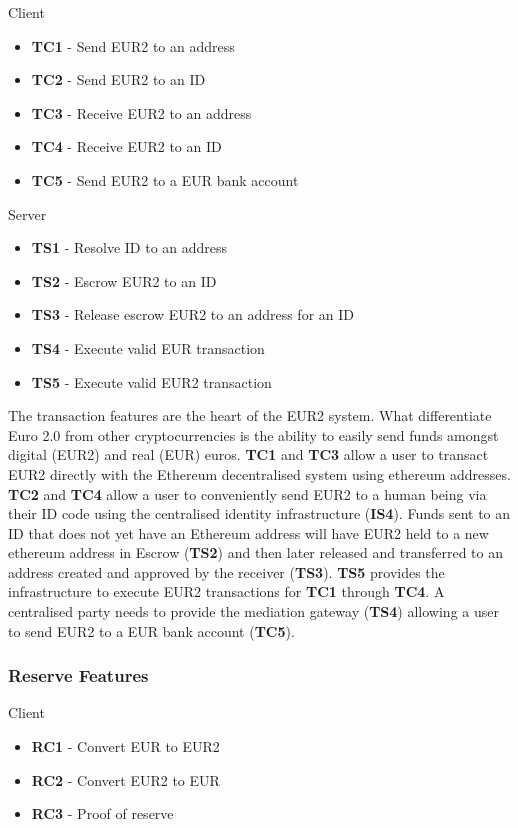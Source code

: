 \documentclass[a4paper,12pt]{article} %
\begin{document}
{{Client
\begin{itemize}
	\item \textbf{TC1} - Send EUR2 to an address
	\item \textbf{TC2} - Send EUR2 to an ID
	\item \textbf{TC3} - Receive EUR2 to an address
	\item \textbf{TC4} - Receive EUR2 to an ID
	\item \textbf{TC5} - Send EUR2 to a EUR bank account
\end{itemize}

Server
\begin{itemize}
	\item \textbf{TS1} - Resolve ID to an address
	\item \textbf{TS2} - Escrow EUR2 to an ID
	\item \textbf{TS3} - Release escrow EUR2 to an address for an ID
	\item \textbf{TS4} - Execute valid EUR transaction
	\item \textbf{TS5} - Execute valid EUR2 transaction
\end{itemize}

The transaction features are the heart of the EUR2 system. What differentiate Euro 2.0 from other cryptocurrencies is the ability to easily send funds amongst digital (EUR2) and real (EUR) euros. \textbf{TC1} and \textbf{TC3} allow a user to transact EUR2 directly with the Ethereum decentralised system using ethereum addresses. \textbf{TC2} and \textbf{TC4} allow a user to conveniently send EUR2 to a human being via their ID code using the centralised identity infrastructure (\textbf{IS4}). Funds sent to an ID that does not yet have an Ethereum address will have EUR2 held to a new ethereum address in Escrow (\textbf{TS2}) and then later released and transferred to an address created and approved by the receiver (\textbf{TS3}). \textbf{TS5} provides the infrastructure to execute EUR2 transactions for \textbf{TC1} through \textbf{TC4}. A centralised party needs to provide the mediation gateway (\textbf{TS4}) allowing a user to send EUR2 to a EUR bank account (\textbf{TC5}).

\subsubsection{Reserve Features} \label{sssec:3.3:reserve}

Client
\begin{itemize}
	\item \textbf{RC1} - Convert EUR to EUR2
	\item \textbf{RC2} - Convert EUR2 to EUR
	\item \textbf{RC3} - Proof of reserve
\end{itemize}

}}
\end{document}
